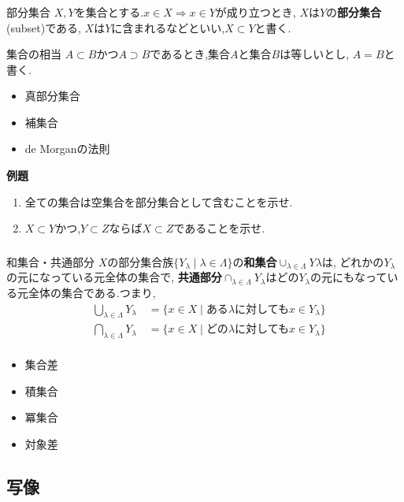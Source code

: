 \documentclass[dvipdfmx,b4j]{jsarticle}
\begin{document}
\subsubsection{}
\begin{definition}{部分集合}{}
$X,Y$を集合とする.$x\in X\Longrightarrow x\in Y$が成り立つとき,
$X$は$Y$の\textbf{部分集合}(subset)である,
$X$は$Y$に含まれるなどといい,$X\subset Y$と書く.
\end{definition}
\begin{definition}{集合の相当}{}
$A\subset B $かつ$A\supset B$であるとき,集合$A$と集合$B$は等しいとし,
$A = B $と書く.
\end{definition}
\begin{itemize}
    \item 真部分集合
    \item 補集合
    \item de Morganの法則
\end{itemize}
%
\begin{oframed}
\noindent\textbf{例題}
\begin{enumerate}
    \item 全ての集合は空集合を部分集合として含むことを示せ.
    \item $X\subset Y$かつ,$Y\subset Z$ならば$X\subset Z$であることを示せ.%
\end{enumerate}
\end{oframed}
\subsubsection{}
\begin{definition}{和集合・共通部分}{}
$X$の部分集合族$\{Y_\lambda\mid\lambda\in\Lambda\}$の\textbf{和集合}$\cup_{\lambda\in\Lambda}Y\lambda$は,
どれかの$Y_\lambda$の元になっている元全体の集合で,
\textbf{共通部分}$\cap_{\lambda\in\Lambda}Y_\lambda$はどの$Y_\lambda$の元にもなっている元全体の集合である.つまり,
\begin{align*}
&\bigcup_{\lambda\in\Lambda}Y_\lambda\quad=\{x\in X\mid \text{ある}\lambda\text{に対しても}x\in Y_\lambda\}\\
&\bigcap_{\lambda\in\Lambda}Y_\lambda\quad=\{x\in X\mid \text{どの}\lambda\text{に対しても}x\in Y_\lambda\}\\
\end{align*}

\end{definition}
\begin{itemize}
\item 集合差
\item 積集合
\item 冪集合
\item 対象差
\end{itemize}

\subsection{写像}
\end{document}
